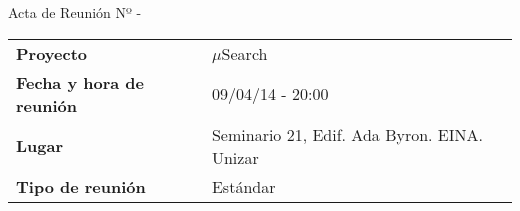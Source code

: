 \begin{center}	
\Large{Acta de Reunión Nº \numeroDeReunion\hspace{0.25em}-\hspace{0.25em}\tituloReunion}
\end{center}
\vspace{1.5em}

\begin{longtable}{ | L{\tabcolsep} |
				     L{\tabcolsep} | }
\hline %
  \\
\hline %
{\bf Proyecto} & $\mu$Search \\
\hline %
{\bf Fecha y hora de reunión} & 09/04/14 - 20:00 \\
\hline %
{\bf Lugar} & Seminario 21, Edif. Ada Byron. EINA. Unizar \\
\hline %
{\bf Tipo de reunión} & Estándar \\
\hline %
\end{longtable}


